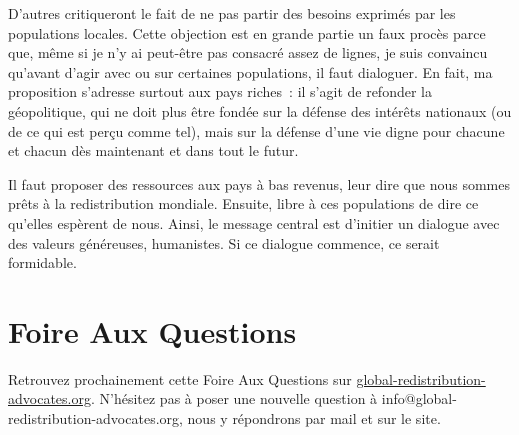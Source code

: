 \documentclass[a5paper,french,openany]{memoir}
\begin{document}
D'autres critiqueront le fait 
de ne pas partir des besoins exprimés par les populations locales. 
Cette objection est en grande partie un faux procès parce que, même si je n'y ai peut-être pas consacré assez de lignes, je suis convaincu qu'avant d'agir avec ou sur certaines populations, il faut dialoguer. En fait, ma proposition s'adresse surtout aux pays riches~: il s'agit de refonder la géopolitique, qui ne doit plus être fondée sur la défense des intérêts nationaux (ou de ce qui est perçu comme tel), mais sur la défense d'une vie digne pour chacune et chacun dès maintenant et dans tout le futur. 

Il faut proposer des ressources aux pays à bas revenus, leur dire que nous sommes prêts à la redistribution mondiale. Ensuite, libre à ces populations de dire ce qu'elles espèrent de nous. 
Ainsi, le message central est d'initier un dialogue avec des valeurs généreuses, humanistes. Si ce dialogue commence, ce serait formidable. 

\chapter*{Foire Aux Questions}\label{ch:faq}

Retrouvez prochainement cette Foire Aux Questions sur \href{http://global-redistribution-advocates.org/}{global-redistribution-advocates.org}. N'hésitez pas à poser une nouvelle question à info@global-redistribution-advocates.org, nous y répondrons par mail et sur le site.
\end{document}
